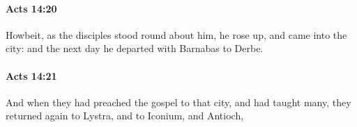 		\paragraph{Acts 14:20} %
			\label{ACTS-14-20}

			Howbeit, as the disciples stood round about him, he rose up, and came into the city: and the next day he departed with Barnabas to Derbe.

			\begin{framed}
			\scriptsize
				\begin{compactdesc}
					\item[SBLG] 
				\end{compactdesc}
			\end{framed}

		\paragraph{Acts 14:21} %
			\label{ACTS-14-21}

			And when they had preached the gospel to that city, and had taught many, they returned again to Lystra, and to Iconium, and Antioch,

